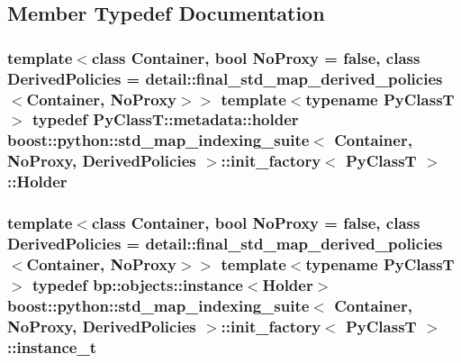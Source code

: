 \subsection{Member Typedef Documentation}
\subsubsection[{\texorpdfstring{Holder}{Holder}}]{\setlength{\rightskip}{0pt plus 5cm}template$<$class Container, bool No\+Proxy = false, class Derived\+Policies = detail\+::final\+\_\+std\+\_\+map\+\_\+derived\+\_\+policies$<$\+Container, No\+Proxy$>$$>$ template$<$typename Py\+ClassT $>$ typedef Py\+Class\+T\+::metadata\+::holder {\bf boost\+::python\+::std\+\_\+map\+\_\+indexing\+\_\+suite}$<$ Container, No\+Proxy, Derived\+Policies $>$\+::{\bf init\+\_\+factory}$<$ Py\+ClassT $>$\+::{\bf Holder}}\hypertarget{structboost_1_1python_1_1std__map__indexing__suite_1_1init__factory_a785b4c017210dd048b47eb6c04a5cdc6}{}\label{structboost_1_1python_1_1std__map__indexing__suite_1_1init__factory_a785b4c017210dd048b47eb6c04a5cdc6}
\subsubsection[{\texorpdfstring{instance\+\_\+t}{instance_t}}]{\setlength{\rightskip}{0pt plus 5cm}template$<$class Container, bool No\+Proxy = false, class Derived\+Policies = detail\+::final\+\_\+std\+\_\+map\+\_\+derived\+\_\+policies$<$\+Container, No\+Proxy$>$$>$ template$<$typename Py\+ClassT $>$ typedef bp\+::objects\+::instance$<${\bf Holder}$>$ {\bf boost\+::python\+::std\+\_\+map\+\_\+indexing\+\_\+suite}$<$ Container, No\+Proxy, Derived\+Policies $>$\+::{\bf init\+\_\+factory}$<$ Py\+ClassT $>$\+::{\bf instance\+\_\+t}}\hypertarget{structboost_1_1python_1_1std__map__indexing__suite_1_1init__factory_aea2971d45c2f4de6ac83494b504d9a19}{}\label{structboost_1_1python_1_1std__map__indexing__suite_1_1init__factory_aea2971d45c2f4de6ac83494b504d9a19}


